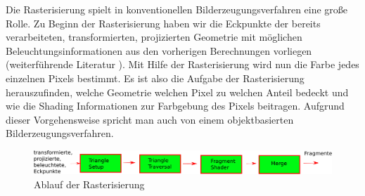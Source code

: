         Die Rasterisierung spielt in konventionellen Bilderzeugungsverfahren eine große Rolle. 
        Zu Beginn der Rasterisierung haben wir die Eckpunkte der bereits verarbeiteten, transformierten, projizierten Geometrie mit möglichen
        Beleuchtungsinformationen aus den vorherigen Berechnungen vorliegen (weiterführende Literatur \cite{akenine2018real}). 
        Mit Hilfe der Rasterisierung wird nun die Farbe jedes einzelnen Pixels bestimmt. Es ist also die Aufgabe der Rasterisierung herauszufinden, 
        welche Geometrie welchen Pixel zu welchen Anteil bedeckt und wie die Shading Informationen zur Farbgebung des Pixels beitragen. 
        Aufgrund dieser Vorgehensweise spricht man auch von einem objektbasierten Bilderzeugungsverfahren.

        \begin{figure}[H]
            \centering
            \includegraphics[width=\linewidth]{content/PathTracer/Bilder/Rasterisierung.pdf}
            \caption{Ablauf der Rasterisierung}
            \label{pic:Rasterisierungsablauf}
        \end{figure}


